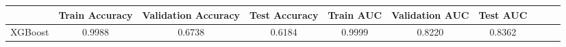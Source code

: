 \begin{tabular}{lccccccccc}
\toprule
 & Train Accuracy & Validation Accuracy & Test Accuracy & Train AUC & Validation AUC & Test AUC \\
\midrule
XGBoost & 0.9988 & 0.6738 & 0.6184 & 0.9999 & 0.8220 & 0.8362 \\
\bottomrule
\end{tabular}
